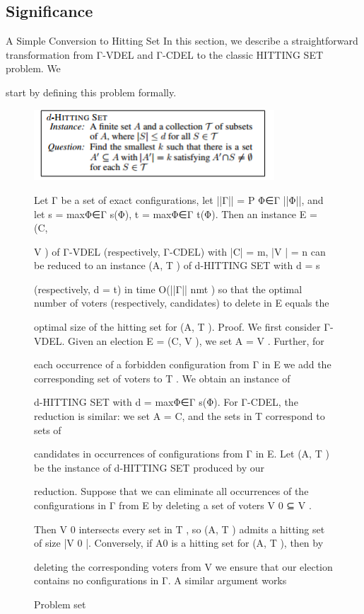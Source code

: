 \documentclass[12pt, a4paper]{report}
\begin{document}
\subsection*{Significance}
A Simple Conversion to Hitting Set
In this section, we describe a straightforward transformation from Γ-VDEL and Γ-CDEL to the classic HITTING SET problem. We 

start by defining this problem formally. 
\begin{figure}[ht!]
\centering
\includegraphics[width=90mm]{setprob.png}
\caption{Problem set \label{overflow}}
Let Γ be a set of exact configurations, let ||Γ|| = P Φ∈Γ ||Φ||, and let s = maxΦ∈Γ s(Φ), t = maxΦ∈Γ t(Φ). Then an instance E = (C, 

V ) of Γ-VDEL (respectively, Γ-CDEL) with |C| = m, |V | = n can be reduced to an instance (A, T ) of d-HITTING SET with d = s 

(respectively, d = t) in time O(||Γ|| nmt ) so that the optimal number of voters (respectively, candidates) to delete in E equals the 

optimal size of the hitting set for (A, T ). Proof. We first consider Γ-VDEL. Given an election E = (C, V ), we set A = V . Further, for 

each occurrence of a forbidden configuration from Γ in E we add the corresponding set of voters to T . We obtain an instance of 

d-HITTING SET with d = maxΦ∈Γ s(Φ). For Γ-CDEL, the reduction is similar: we set A = C, and the sets in T correspond to sets of 

candidates in occurrences of configurations from Γ in E. Let (A, T ) be the instance of d-HITTING SET produced by our 

reduction. Suppose that we can eliminate all occurrences of the configurations in Γ from E by deleting a set of voters V 0 ⊆ V . 

Then V 0 intersects every set in T , so (A, T ) admits a hitting set of size |V 0 |. Conversely, if A0 is a hitting set for (A, T ), then by 

deleting the corresponding voters from V we ensure that our election contains no configurations in Γ. A similar argument works 


\end{figure}
\end{document}
